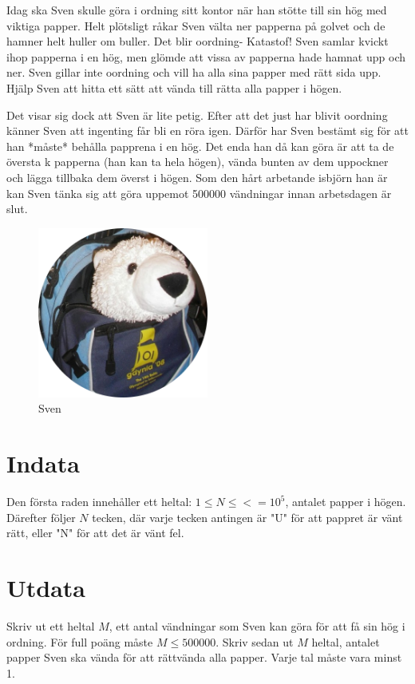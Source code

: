 Idag ska Sven skulle göra i ordning sitt kontor när han stötte till sin hög med viktiga papper.
Helt plötsligt råkar Sven välta ner papperna på golvet och de hamner helt huller om buller. Det blir oordning- Katastof!
Sven samlar kvickt ihop papperna i en hög, men glömde att vissa av papperna hade hamnat upp och ner.
Sven gillar inte oordning och vill ha alla sina papper med rätt sida upp.
Hjälp Sven att hitta ett sätt att vända till rätta alla papper i högen.

Det visar sig dock att Sven är lite petig.
Efter att det just har blivit oordning känner Sven att ingenting får bli en röra igen.
Därför har Sven bestämt sig för att han *måste* behålla papprena i en hög.
Det enda han då kan göra är att ta de översta k papperna (han kan ta hela högen), vända bunten av dem uppockner och lägga tillbaka dem överst i högen.
Som den hårt arbetande isbjörn han är kan Sven tänka sig att göra uppemot 500000 vändningar innan arbetsdagen är slut.

\begin{figure}[h]
	\centering
\includegraphics[width=0.5\textwidth]{sven-circular.png}
\caption{Sven}
\end{figure}

\section*{Indata}
Den första raden innehåller ett heltal: $1\leq N \leq <= 10^5$, antalet papper i högen.
Därefter följer $N$ tecken, där varje tecken antingen är "U" för att pappret är vänt rätt, eller "N" för att det är vänt fel. 

\section*{Utdata}
Skriv ut ett heltal $M$, ett antal vändningar som Sven kan göra för att få sin hög i ordning. För full poäng måste  $M \leq 500000$.
Skriv sedan ut $M$ heltal, antalet papper Sven ska vända för att rättvända alla papper. Varje tal måste vara minst 1.

